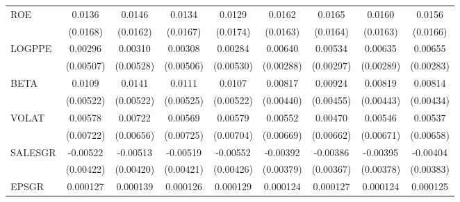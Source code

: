 \begin{table}[htbp]
\begin{tabular}{l*{8}{c}}
ROE                 &      0.0136         &      0.0146         &      0.0134         &      0.0129         &      0.0162         &      0.0165         &      0.0160         &      0.0156         \\
                    &    (0.0168)         &    (0.0162)         &    (0.0167)         &    (0.0174)         &    (0.0163)         &    (0.0164)         &    (0.0163)         &    (0.0166)         \\
LOGPPE              &     0.00296         &     0.00310         &     0.00308         &     0.00284         &     0.00640\sym{**} &     0.00534\sym{*}  &     0.00635\sym{**} &     0.00655\sym{**} \\
                    &   (0.00507)         &   (0.00528)         &   (0.00506)         &   (0.00530)         &   (0.00288)         &   (0.00297)         &   (0.00289)         &   (0.00283)         \\
BETA                &      0.0109\sym{**} &      0.0141\sym{***}&      0.0111\sym{**} &      0.0107\sym{**} &     0.00817\sym{*}  &     0.00924\sym{**} &     0.00819\sym{*}  &     0.00814\sym{*}  \\
                    &   (0.00522)         &   (0.00522)         &   (0.00525)         &   (0.00522)         &   (0.00440)         &   (0.00455)         &   (0.00443)         &   (0.00434)         \\
VOLAT               &     0.00578         &     0.00722         &     0.00569         &     0.00579         &     0.00552         &     0.00470         &     0.00546         &     0.00537         \\
                    &   (0.00722)         &   (0.00656)         &   (0.00725)         &   (0.00704)         &   (0.00669)         &   (0.00662)         &   (0.00671)         &   (0.00658)         \\
SALESGR             &    -0.00522         &    -0.00513         &    -0.00519         &    -0.00552         &    -0.00392         &    -0.00386         &    -0.00395         &    -0.00404         \\
                    &   (0.00422)         &   (0.00420)         &   (0.00421)         &   (0.00426)         &   (0.00379)         &   (0.00367)         &   (0.00378)         &   (0.00383)         \\
EPSGR               &    0.000127\sym{*}  &    0.000139\sym{*}  &    0.000126         &    0.000129\sym{*}  &    0.000124\sym{*}  &    0.000127\sym{*}  &    0.000124\sym{*}  &    0.000125\sym{*}  \\

\end{tabular}
\end{table}
